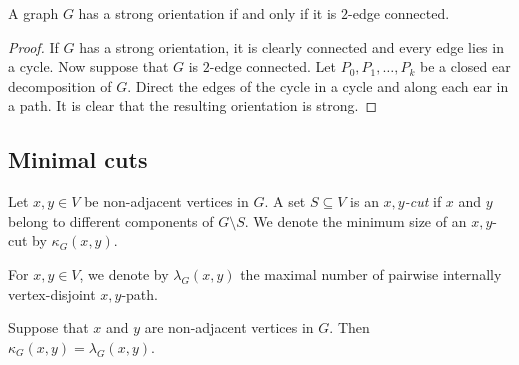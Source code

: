 \begin{izrek}[Robbin]
A graph $G$ has a strong orientation if and only if it is $2$-edge
connected.
\end{izrek}

\begin{proof}
If $G$ has a strong orientation, it is clearly connected and every
edge lies in a cycle. Now suppose that $G$ is $2$-edge connected.
Let $P_0, P_1, \dots, P_k$ be a closed ear decomposition of $G$.
Direct the edges of the cycle in a cycle and along each ear in a path.
It is clear that the resulting orientation is strong.
\end{proof}

\newpage

\subsection{Minimal cuts}

\begin{definicija}
Let $x, y \in V$ be non-adjacent vertices in $G$. A set
$S \subseteq V$ is an \emph{$x,y$-cut} if $x$ and
$y$ belong to different components of $G \setminus S$. We denote
the minimum size of an $x,y$-cut by $\kappa_G(x,y)$.
\end{definicija}

\begin{definicija}
For $x, y \in V$, we denote by $\lambda_G(x,y)$ the maximal number
of pairwise internally vertex-disjoint $x,y$-path.
\end{definicija}

\begin{izrek}[Menger]
Suppose that $x$ and $y$ are non-adjacent vertices in $G$. Then
$\kappa_G(x,y) = \lambda_G(x,y)$.
\end{izrek}

